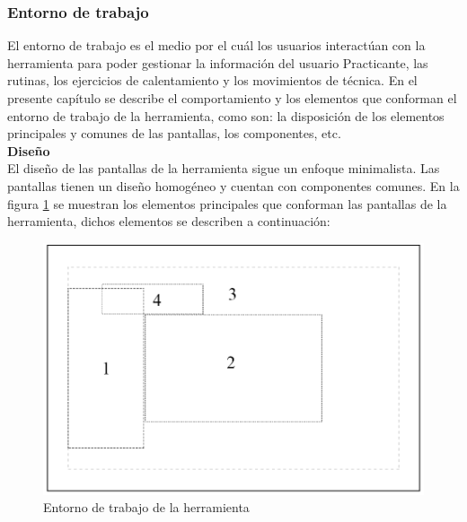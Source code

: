 \subsubsection{Entorno de trabajo}
El entorno de trabajo es el medio por el cuál los usuarios interactúan con la herramienta para poder gestionar la información del usuario Practicante, las rutinas, los ejercicios de calentamiento y los movimientos de técnica.
En el presente capítulo se describe el comportamiento y los elementos que conforman el entorno de trabajo de la herramienta, como son: la disposición de los elementos principales y comunes de las pantallas, los componentes, etc.\\

 \textbf{\textcolor[rgb]{0, 0, 0.545098}{Diseño}} \\

 El diseño de las pantallas de la herramienta sigue un enfoque minimalista. Las pantallas tienen un diseño homogéneo y cuentan con componentes comunes.
 En la figura \ref{fig:Entornodetrabajo} se muestran los elementos principales que conforman las pantallas de la herramienta, dichos elementos se describen a continuación:

 \begin{figure}[H]
	\centering
		\includegraphics[scale=2]{./Figuras/Entorno_de_trabajo}
	\caption{Entorno de trabajo de la herramienta}
	\label{fig:Entornodetrabajo}
 \end{figure}
 
